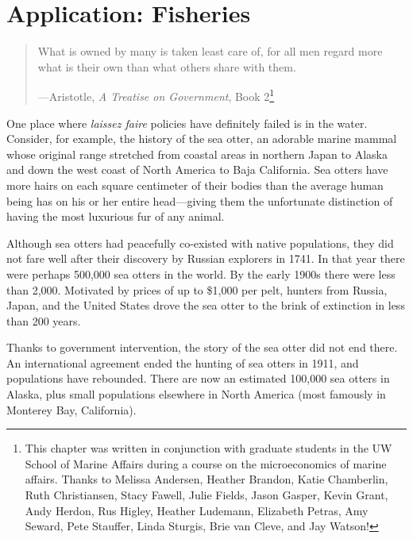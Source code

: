 \chapter{Application: Fisheries}
\label{2fish}

\begin{quote}
What is owned by many is taken least care of, for all men regard more what is their own than what others share with them.

\hfill ---Aristotle, \emph{A Treatise on Government}, Book 2\footnote{This chapter was written in conjunction  with graduate students in the UW School of Marine Affairs during a course on the microeconomics of marine affairs. Thanks to Melissa Andersen, Heather Brandon, Katie Chamberlin, Ruth Christiansen, Stacy Fawell, Julie Fields, Jason Gasper, Kevin Grant, Andy Herdon, Rus Higley, Heather Ludemann, Elizabeth Petras, Amy Seward, Pete Stauffer, Linda Sturgis, Brie van Cleve, and Jay Watson!}
\end{quote}

\vspace*{.4cm}

\noindent One place where \emph{laissez faire} policies have definitely failed is in the water. Consider, for example, the history of the sea otter, an adorable marine mammal whose original range stretched from coastal areas in northern Japan to Alaska and down the west coast of North America to Baja California. Sea otters have more hairs on each square centimeter of their bodies than the average human being has on his or her entire head---giving them the unfortunate distinction of having the most luxurious fur of any animal.

Although sea otters had peacefully co-existed with native populations, they did not fare well after their discovery by Russian explorers in 1741. In that year there were perhaps 500,000 sea otters in the world. By the early 1900s there were less than 2,000. Motivated by prices of up to \$1,000 per pelt, hunters from Russia, Japan, and the United States drove the sea otter to the brink of extinction in less than 200 years.

Thanks to government intervention, the story of the sea otter did not end there. An international agreement ended the hunting of sea otters in 1911, and populations have rebounded. There are now an estimated 100,000 sea otters in Alaska, plus small populations elsewhere in North America (most famously in Monterey Bay, California).


